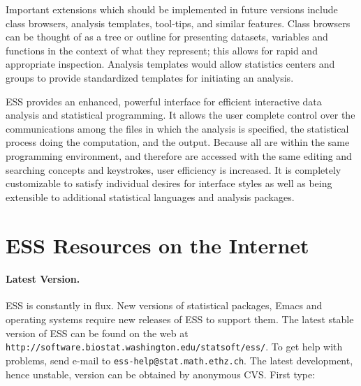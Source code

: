 \documentclass{article}
\def\url#1{\stexttt{#1}} %
\newcommand{\stexttt}[1]{{\small\texttt{#1}}}
\begin{document}
Important extensions which should be implemented in future
versions include class browsers, analysis templates, tool-tips, and
similar features.  Class browsers can be thought of as a tree or
outline for presenting datasets, variables and functions in the
context of what they represent; this allows for rapid and appropriate
inspection.  Analysis templates would allow statistics centers and
groups to provide standardized templates for initiating an analysis.

ESS provides 
an enhanced, powerful interface for efficient interactive data
analysis and statistical programming.  
It allows the user complete control over the communications among the
files in which the analysis is specified, the statistical process doing
the computation, and the output.  Because all are within the same programming
environment, and therefore are accessed with the same
editing and searching concepts and keystrokes, user efficiency is increased.
It is completely customizable
to satisfy individual desires for interface styles as well as being
extensible to additional statistical languages and analysis packages.







\appendix 
\section{ESS Resources on the Internet}
\label{sec:access}

\paragraph{Latest Version.}

ESS is constantly in flux.  New versions of statistical
packages, Emacs and operating systems require new releases of ESS to
support them.  The latest stable version of ESS can be found on the web at
\url{http://software.biostat.washington.edu/statsoft/ess/}.  To get help
with problems, send e-mail to \url{ess-help@stat.math.ethz.ch}.
The latest development, hence unstable, version can be obtained by
anonymous CVS.  First type:
\end{document}
